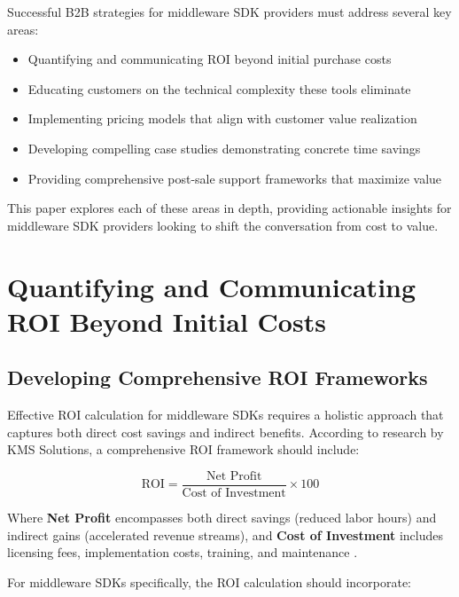 \documentclass[11pt,a4paper]{article}
\begin{document}
Successful B2B strategies for middleware SDK providers must address several key areas:
\begin{itemize}
    \item Quantifying and communicating ROI beyond initial purchase costs
    \item Educating customers on the technical complexity these tools eliminate
    \item Implementing pricing models that align with customer value realization
    \item Developing compelling case studies demonstrating concrete time savings
    \item Providing comprehensive post-sale support frameworks that maximize value
\end{itemize}

This paper explores each of these areas in depth, providing actionable insights for middleware SDK providers looking to shift the conversation from cost to value.

\section{Quantifying and Communicating ROI Beyond Initial Costs}

\subsection{Developing Comprehensive ROI Frameworks}

Effective ROI calculation for middleware SDKs requires a holistic approach that captures both direct cost savings and indirect benefits. According to research by KMS Solutions, a comprehensive ROI framework should include:

\begin{equation}
\text{ROI} = \frac{\text{Net Profit}}{\text{Cost of Investment}} \times 100
\end{equation}

Where \textbf{Net Profit} encompasses both direct savings (reduced labor hours) and indirect gains (accelerated revenue streams), and \textbf{Cost of Investment} includes licensing fees, implementation costs, training, and maintenance \citep{kms2025measure}.

For middleware SDKs specifically, the ROI calculation should incorporate:
\end{document}
